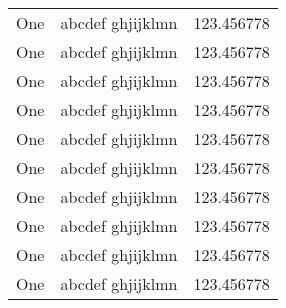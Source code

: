 \documentclass{article}
\begin{document}
\begin{center}
\begin{longtable}{|l|l|l|}
		One                                                  & abcdef ghjijklmn                            & 123.456778                                 \\
		One                                                  & abcdef ghjijklmn                            & 123.456778                                 \\
		One                                                  & abcdef ghjijklmn                            & 123.456778                                 \\
		One                                                  & abcdef ghjijklmn                            & 123.456778                                 \\
		One                                                  & abcdef ghjijklmn                            & 123.456778                                 \\
		One                                                  & abcdef ghjijklmn                            & 123.456778                                 \\
		One                                                  & abcdef ghjijklmn                            & 123.456778                                 \\
		One                                                  & abcdef ghjijklmn                            & 123.456778                                 \\
		One                                                  & abcdef ghjijklmn                            & 123.456778                                 \\
		One                                                  & abcdef ghjijklmn                            & 123.456778                                 \\
	\end{longtable}
\end{center}
\end{document}

